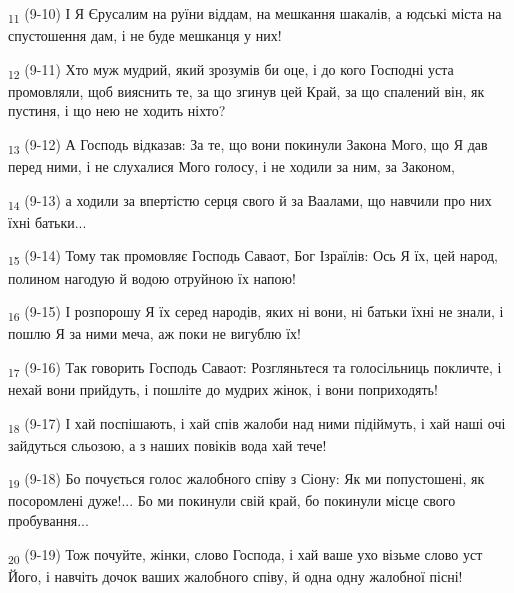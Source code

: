 \begin{tcolorbox}
\textsubscript{11} (9-10) І Я Єрусалим на руїни віддам, на мешкання шакалів, а юдські міста на спустошення дам, і не буде мешканця у них!
\end{tcolorbox}
\begin{tcolorbox}
\textsubscript{12} (9-11) Хто муж мудрий, який зрозумів би оце, і до кого Господні уста промовляли, щоб вияснить те, за що згинув цей Край, за що спалений він, як пустиня, і що нею не ходить ніхто?
\end{tcolorbox}
\begin{tcolorbox}
\textsubscript{13} (9-12) А Господь відказав: За те, що вони покинули Закона Мого, що Я дав перед ними, і не слухалися Мого голосу, і не ходили за ним, за Законом,
\end{tcolorbox}
\begin{tcolorbox}
\textsubscript{14} (9-13) а ходили за впертістю серця свого й за Ваалами, що навчили про них їхні батьки...
\end{tcolorbox}
\begin{tcolorbox}
\textsubscript{15} (9-14) Тому так промовляє Господь Саваот, Бог Ізраїлів: Ось Я їх, цей народ, полином нагодую й водою отруйною їх напою!
\end{tcolorbox}
\begin{tcolorbox}
\textsubscript{16} (9-15) І розпорошу Я їх серед народів, яких ні вони, ні батьки їхні не знали, і пошлю Я за ними меча, аж поки не вигублю їх!
\end{tcolorbox}
\begin{tcolorbox}
\textsubscript{17} (9-16) Так говорить Господь Саваот: Розгляньтеся та голосільниць покличте, і нехай вони прийдуть, і пошліте до мудрих жінок, і вони поприходять!
\end{tcolorbox}
\begin{tcolorbox}
\textsubscript{18} (9-17) І хай поспішають, і хай спів жалоби над ними підіймуть, і хай наші очі зайдуться сльозою, а з наших повіків вода хай тече!
\end{tcolorbox}
\begin{tcolorbox}
\textsubscript{19} (9-18) Бо почується голос жалобного співу з Сіону: Як ми попустошені, як посоромлені дуже!... Бо ми покинули свій край, бо покинули місце свого пробування...
\end{tcolorbox}
\begin{tcolorbox}
\textsubscript{20} (9-19) Тож почуйте, жінки, слово Господа, і хай ваше ухо візьме слово уст Його, і навчіть дочок ваших жалобного співу, й одна одну жалобної пісні!
\end{tcolorbox}

